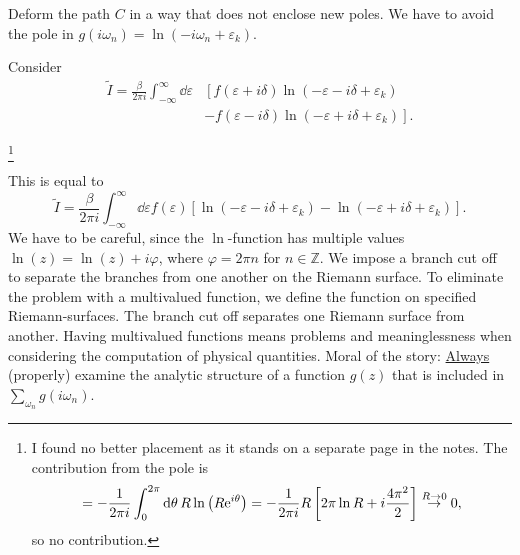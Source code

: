\begin{figure}
\centering

\end{figure}

\begin{figure}
\centering
\label{fig:path_deform}
\begin{subfigure}{0.49\textwidth}


\end{subfigure}
\begin{subfigure}{0.49\textwidth}


\end{subfigure}
\end{figure}

Deform the path $C$ in a way that does not enclose new poles. We have to avoid the pole in $g(i\omega_n) = \ln(-i\omega_n + \varepsilon_k)$.

Consider 
\begin{align}
\tilde{I} = \frac{\beta}{2\pi i}\int_{-\infty}^\infty\dd{\varepsilon}&\left[f(\varepsilon + i\delta)\ln\left(-\varepsilon -i\delta + \varepsilon_k\right) \right.\nonumber\\
&\left.-f(\varepsilon-i\delta)\ln\left(-\varepsilon  + i\delta + \varepsilon_k\right) \right].
\end{align}

\footnote{I found no better placement as it stands on a separate page in the notes. The contribution from the pole is
\begin{equation*}
= -\frac{1}{2\pi i}\int_0^{2\pi}\dd{\theta}R\ln\left(R\mathrm{e}^{i\theta}\right) = -\frac{1}{2\pi i} R\left[2\pi\ln R + i\frac{4\pi^2}{2}\right]
 \stackrel{R \rightarrow 0}{\rightarrow}  0,
\end{equation*}
so no contribution.
}

This is equal to 
\begin{equation}
\label{unc:is_it_really_equal}
\tilde{I} = \frac{\beta}{2\pi i}\int_{-\infty}^\infty\dd{\varepsilon}f(\varepsilon)\left[\ln(-\varepsilon -i\delta + \varepsilon_k) - \ln(-\varepsilon + i\delta + \varepsilon_k)\right].
\end{equation}
We have to be careful, since the $\ln$-function has multiple values $\ln(z) = \ln(z) + i\varphi$, where $\varphi = 2\pi n$ for $n \in \mathbb{Z}$. We impose a branch cut off to separate the branches from one another on the Riemann surface. To eliminate the problem with a multivalued function, we define the function on specified Riemann-surfaces. The branch cut off separates one Riemann surface from another. Having multivalued functions means problems and meaninglessness when considering the computation of physical quantities. Moral of the story: \underline{Always} (properly)
examine the analytic structure of a function $g(z)$ that is included in $\sum_{\omega_n}g(i\omega_n)$.

